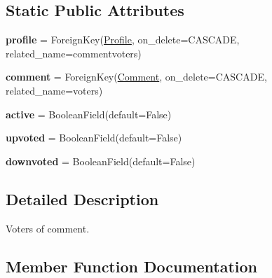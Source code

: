 \subsection*{Static Public Attributes}
\begin{DoxyCompactItemize}
\item 
\hypertarget{class_meanco_app_1_1models_1_1comment_1_1_voter_a20cc8ba1aded9777027b850796955250}{}\label{class_meanco_app_1_1models_1_1comment_1_1_voter_a20cc8ba1aded9777027b850796955250} 
{\bfseries profile} = Foreign\+Key(\hyperlink{class_meanco_app_1_1models_1_1profile_1_1_profile}{Profile}, on\+\_\+delete=C\+A\+S\+C\+A\+DE, related\+\_\+name=\textquotesingle{}commentvoters\textquotesingle{})
\item 
\hypertarget{class_meanco_app_1_1models_1_1comment_1_1_voter_adb8a2bf6f1ca71e4f102ed39584c0fb7}{}\label{class_meanco_app_1_1models_1_1comment_1_1_voter_adb8a2bf6f1ca71e4f102ed39584c0fb7} 
{\bfseries comment} = Foreign\+Key(\hyperlink{class_meanco_app_1_1models_1_1comment_1_1_comment}{Comment}, on\+\_\+delete=C\+A\+S\+C\+A\+DE, related\+\_\+name=\textquotesingle{}voters\textquotesingle{})
\item 
\hypertarget{class_meanco_app_1_1models_1_1comment_1_1_voter_afbb6d32ab0f4ebe41609c8238163b440}{}\label{class_meanco_app_1_1models_1_1comment_1_1_voter_afbb6d32ab0f4ebe41609c8238163b440} 
{\bfseries active} = Boolean\+Field(default=False)
\item 
\hypertarget{class_meanco_app_1_1models_1_1comment_1_1_voter_afc3d6b4106c156e5aa97108603a690b8}{}\label{class_meanco_app_1_1models_1_1comment_1_1_voter_afc3d6b4106c156e5aa97108603a690b8} 
{\bfseries upvoted} = Boolean\+Field(default=False)
\item 
\hypertarget{class_meanco_app_1_1models_1_1comment_1_1_voter_a8f4339c618f747bdd7877db78234fca1}{}\label{class_meanco_app_1_1models_1_1comment_1_1_voter_a8f4339c618f747bdd7877db78234fca1} 
{\bfseries downvoted} = Boolean\+Field(default=False)
\end{DoxyCompactItemize}


\subsection{Detailed Description}
Voters of comment. 

\subsection{Member Function Documentation}
\hypertarget{class_meanco_app_1_1models_1_1comment_1_1_voter_a3da7c66cab382373d94f0f28788d07a5}{}\label{class_meanco_app_1_1models_1_1comment_1_1_voter_a3da7c66cab382373d94f0f28788d07a5} 
